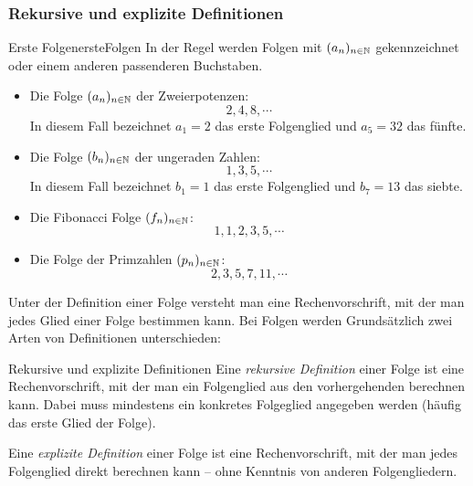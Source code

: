 \subsubsection{Rekursive und explizite Definitionen}
\begin{bsp}{Erste Folgen}{ersteFolgen}
    In der Regel werden Folgen mit $(a_n)_{n\in \mathbb{N}}$ gekennzeichnet oder einem anderen passenderen Buchstaben.
    \begin{itemize}
        \item Die Folge $(a_n)_{n\in \mathbb{N}}$ der Zweierpotenzen: \[2, 4, 8, \cdots\]
            In diesem Fall bezeichnet $a_1 = 2$ das erste Folgenglied und $a_5=32$ das fünfte.
        \item Die Folge $(b_n)_{n\in \mathbb{N}}$ der ungeraden Zahlen: \[1, 3, 5, \cdots\]
        In diesem Fall bezeichnet $b_1 = 1$ das erste Folgenglied und $b_7=13$ das siebte.
        \item Die Fibonacci Folge $(f_n)_{n\in \mathbb{N}}$: \[1, 1, 2, 3, 5, \cdots\]
        \item Die Folge der Primzahlen $(p_n)_{n\in \mathbb{N}}$: \[2, 3, 5, 7, 11, \cdots\]
    \end{itemize}
\end{bsp}

Unter der Definition einer Folge versteht man eine Rechenvorschrift, mit der man 
jedes  Glied einer Folge bestimmen kann. Bei Folgen werden Grundsätzlich zwei Arten von Definitionen unterschieden:

\begin{definition}{Rekursive und explizite Definitionen}{}
    Eine \emph{rekursive Definition} einer Folge ist eine Rechenvorschrift, mit der man ein Folgenglied aus den vorhergehenden berechnen kann. Dabei muss mindestens ein konkretes Folgeglied angegeben werden (häufig das erste Glied der Folge).

    Eine \emph{explizite Definition} einer Folge ist eine Rechenvorschrift, mit der man jedes Folgenglied direkt berechnen kann – ohne Kenntnis von anderen Folgengliedern.

\end{definition}


